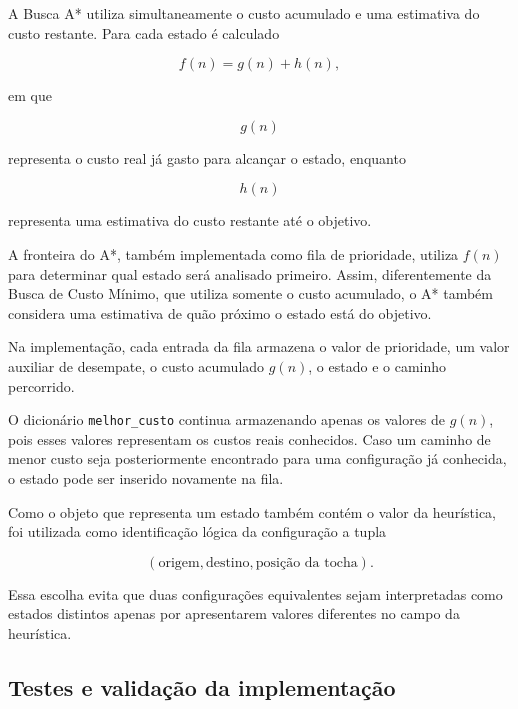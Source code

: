 A Busca A* utiliza simultaneamente o custo acumulado e uma estimativa do custo
restante. Para cada estado é calculado

\begin{equation}
	f(n)=g(n)+h(n),
\end{equation}

em que

\begin{equation}
	g(n)
\end{equation}

representa o custo real já gasto para alcançar o estado, enquanto

\begin{equation}
	h(n)
\end{equation}

representa uma estimativa do custo restante até o objetivo.

A fronteira do A*, também implementada como fila de prioridade, utiliza
$f(n)$ para determinar qual estado será analisado primeiro. Assim,
diferentemente da Busca de Custo Mínimo, que utiliza somente o custo
acumulado, o A* também considera uma estimativa de quão próximo
o estado está do objetivo.

Na implementação, cada entrada da fila armazena o valor de prioridade, um
valor auxiliar de desempate, o custo acumulado $g(n)$, o estado e o caminho
percorrido.

O dicionário \texttt{melhor\_custo} continua armazenando apenas os valores de
$g(n)$, pois esses valores representam os custos reais conhecidos. Caso um
caminho de menor custo seja posteriormente encontrado para uma configuração já
conhecida, o estado pode ser inserido novamente na fila.

Como o objeto que representa um estado também contém o valor da heurística,
foi utilizada como identificação lógica da configuração a tupla

\begin{equation}
	(\text{origem},\text{destino},\text{posição da tocha}).
\end{equation}

Essa escolha evita que duas configurações equivalentes sejam interpretadas
como estados distintos apenas por apresentarem valores diferentes no campo da
heurística.

\subsection{Testes e validação da implementação}

